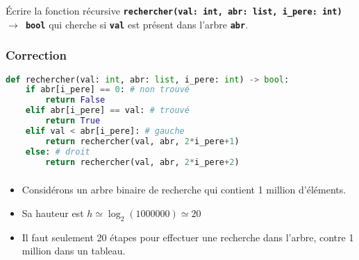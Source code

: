 \documentclass[svgnames,11pt]{beamer}
\begin{document}
\begin{frame}
    \begin{activite}
        Écrire la fonction récursive \textbf{\texttt{rechercher(val: int, abr: list, i\_pere: int) $\rightarrow$ bool}} qui cherche si \textbf{\texttt{val}} est présent dans l'arbre \textbf{\texttt{abr}}.
    \end{activite}


\end{frame}
\begin{frame}[fragile]
    \frametitle{Correction}

    \begin{center}
        \begin{lstlisting}[language=Python , basicstyle=\ttfamily\small, xleftmargin=0.5em, xrightmargin=-3em]
def rechercher(val: int, abr: list, i_pere: int) -> bool:
    if abr[i_pere] == 0: # non trouvé
        return False
    elif abr[i_pere] == val: # trouvé
        return True
    elif val < abr[i_pere]: # gauche
        return rechercher(val, abr, 2*i_pere+1)
    else: # droit
        return rechercher(val, abr, 2*i_pere+2)
\end{lstlisting}
    \end{center}

\end{frame}
\begin{frame}
    \frametitle{}

    \begin{itemize}
        \item<1-> Considérons un arbre binaire de recherche qui contient 1 million d'éléments.
        \item<2-> Sa hauteur est $h\simeq \log_2(1000000)\simeq 20$
        \item<3-> Il faut seulement 20 étapes pour effectuer une recherche dans l'arbre, contre 1 million dans un tableau.
    \end{itemize}
\end{frame}
\end{document}
